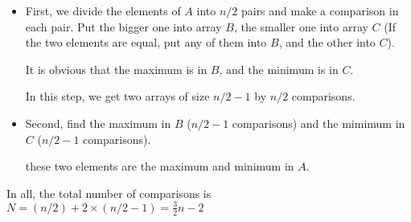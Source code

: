 \begin{itemize}
	\item First, we divide the elements of $A$ into $n/2$ pairs and make a comparison in each pair. Put the bigger one into array $B$, the smaller one into array $C$ 
	(If the two elements are equal, put any of them into $B$, and the other into $C$).

	It is obvious that the maximum is in $B$, and the minimum is in $C$.
	
	In this step, we get two arrays of size $n/2 - 1$ by $n/2$ comparisons.	
	\item Second, find the maximum in $B$ ($n/2 - 1$ comparisons) and the mimimum in $C$ ($n/2 - 1$ comparisons).
	
	these two elements are the maximum and minimum in $A$.
\end{itemize}

In all, the total number of comparisons is $N = (n / 2) + 2 \times (n / 2 - 1) = \frac{3}{2}n - 2$
